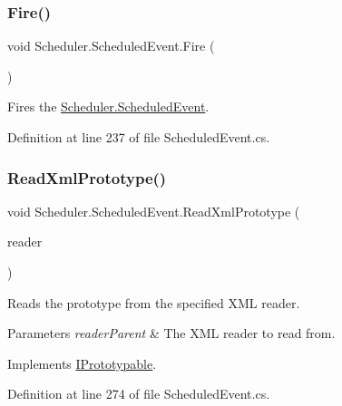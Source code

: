 \subsubsection{\texorpdfstring{Fire()}{Fire()}}
{\footnotesize\ttfamily void Scheduler.\+Scheduled\+Event.\+Fire (\begin{DoxyParamCaption}{ }\end{DoxyParamCaption})}



Fires the \hyperlink{class_scheduler_1_1_scheduled_event}{Scheduler.\+Scheduled\+Event}. 



Definition at line 237 of file Scheduled\+Event.\+cs.

\mbox{\label{class_scheduler_1_1_scheduled_event_a2a4b07d98d26c870403ae7d405c0dfc9}} 
\subsubsection{\texorpdfstring{Read\+Xml\+Prototype()}{ReadXmlPrototype()}}
{\footnotesize\ttfamily void Scheduler.\+Scheduled\+Event.\+Read\+Xml\+Prototype (\begin{DoxyParamCaption}\item[{Xml\+Reader}]{reader }\end{DoxyParamCaption})}



Reads the prototype from the specified X\+ML reader. 


\begin{DoxyParams}{Parameters}
{\em reader\+Parent} & The X\+ML reader to read from.\\
\hline
\end{DoxyParams}


Implements \hyperlink{interface_i_prototypable_a024d752c4be655a7166db5718f1fad6a}{I\+Prototypable}.



Definition at line 274 of file Scheduled\+Event.\+cs.

\mbox{\label{class_scheduler_1_1_scheduled_event_a2ae6d7d00285809b7af79838b419b81f}} 
